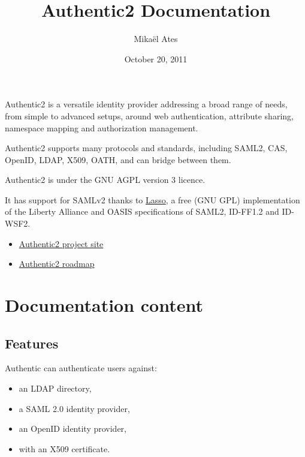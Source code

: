 \documentclass[letterpaper,10pt,english]{sphinxmanual}
\title{Authentic2 Documentation}
\date{October 20, 2011}
\author{Mikaël Ates}
\begin{document}
\maketitle
\tableofcontents
{}\label{index::doc}


Authentic2 is a versatile identity provider addressing a broad
range of needs, from simple to advanced setups, around web authentication,
attribute sharing, namespace mapping and authorization management.

Authentic2 supports many protocols and standards, including SAML2, CAS, OpenID,
LDAP, X509, OATH, and can bridge between them.

Authentic2 is under the GNU AGPL version 3 licence.

It has support for SAMLv2 thanks to \href{http://lasso.entrouvert.org}{Lasso},
a free (GNU GPL) implementation of the Liberty Alliance and OASIS
specifications of SAML2, ID-FF1.2 and ID-WSF2.
\begin{itemize}
\item {} 
\href{http://dev.entrouvert.org/projects/authentic}{Authentic2 project site}

\item {} 
\href{http://dev.entrouvert.org/projects/authentic/roadmap}{Authentic2 roadmap}

\end{itemize}


\chapter{Documentation content}
\label{index:authentic2-s-documentation}\label{index:documentation-content}

\section{Features}
\label{features::doc}\label{features:features}\label{features:id1}
Authentic can authenticate users against:
\begin{itemize}
\item {} 
an LDAP directory,

\item {} 
a SAML 2.0 identity provider,

\item {} 
an OpenID identity provider,

\item {} 
with an X509 certificate.

\end{itemize}
\end{document}
